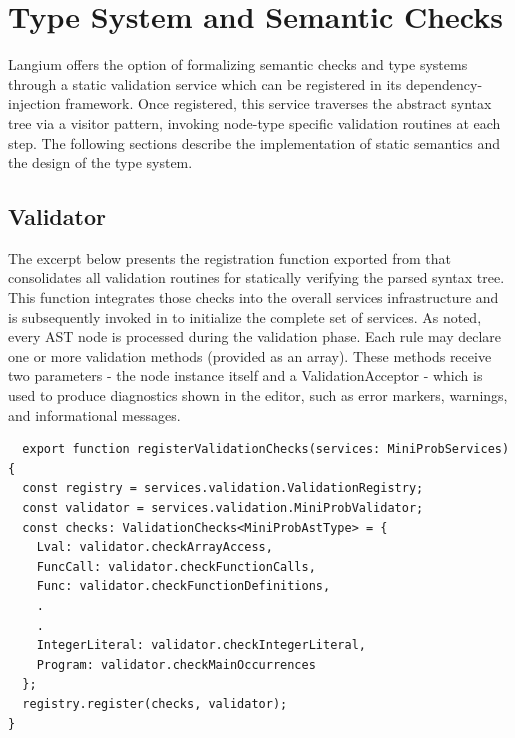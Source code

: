 \section{Type System and Semantic Checks}

Langium offers the option of formalizing semantic checks and type systems through a static validation service which can be registered in its dependency-injection framework.
Once registered, this service traverses the abstract syntax tree via a visitor pattern, invoking node-type specific validation routines at each step.
The following sections describe the implementation of static semantics and the design of the type system.

\subsection*{Validator}

The excerpt below presents the registration function exported from  that consolidates all validation routines for statically
verifying the parsed syntax tree. This function integrates those checks into the overall services infrastructure and is subsequently invoked in  to
initialize the complete set of services. As noted, every AST node is processed during the validation phase. Each rule may declare one or more validation methods
(provided as an array). These methods receive two parameters - the node instance itself and a ValidationAcceptor - which is used to produce diagnostics shown in the editor, such as error markers, warnings, and informational messages.


\begin{verbatim}
  export function registerValidationChecks(services: MiniProbServices) {
  const registry = services.validation.ValidationRegistry;
  const validator = services.validation.MiniProbValidator;
  const checks: ValidationChecks<MiniProbAstType> = {
    Lval: validator.checkArrayAccess,
    FuncCall: validator.checkFunctionCalls,
    Func: validator.checkFunctionDefinitions,
    .
    .
    IntegerLiteral: validator.checkIntegerLiteral,
    Program: validator.checkMainOccurrences
  };
  registry.register(checks, validator);
}
\end{verbatim}

